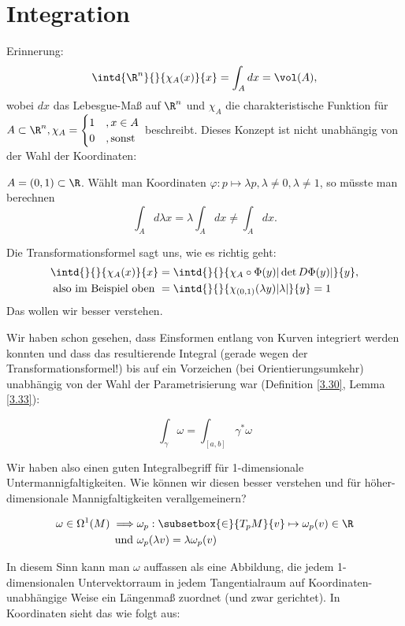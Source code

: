 \chapter{Integration}
\lecture

Erinnerung: 
	\[ \intd{\R^n}{}{\chi_A(x)}{x} = \int_A dx = \vol(A), \]
	wobei $dx$ das Lebesgue-Maß auf $\R^n$ und $\chi_A$ die charakteristische Funktion für $A \subset \R^n, \chi_A = \begin{cases}
		1 &, x \in A \\ 0  &, \text{sonst}
	\end{cases}$ beschreibt. Dieses Konzept ist nicht unabhängig von der Wahl der Koordinaten:

\begin{exmp*}
	\( A = (0,1) \subset \R \). Wählt man Koordinaten \( \varphi: p \mapsto \lambda p, \lambda \neq 0, \lambda \neq 1 \), so müsste man berechnen
	\[ \int_A d\lambda x = \lambda \int_A dx \neq \int_A dx. \]
\end{exmp*}

Die Transformationsformel sagt uns, wie es richtig geht:
\begin{align*}
	\intd{}{}{\chi_A(x)}{x} &= \intd{}{}{\chi_A \circ \Phi(y) |\det D\Phi(y)|}{y},\\
	\text{also im Beispiel oben } &= \intd{}{}{\chi_{(0,1)} (\lambda y) |\lambda|}{y} = 1
\end{align*}
Das wollen wir besser verstehen.

Wir haben schon gesehen, dass Einsformen entlang von Kurven integriert werden konnten und dass das resultierende Integral (gerade wegen der Transformationsformel!) bis auf ein Vorzeichen (bei Orientierungsumkehr) unabhängig von der Wahl der Parametrisierung war (Definition \ref{3.30}, Lemma \ref{3.33}):

\[ \int_\gamma \omega = \int_{[a,b]} \gamma^*\omega \]

Wir haben also einen guten Integralbegriff für 1-dimensionale Untermannigfaltigkeiten. Wie können wir diesen besser verstehen und für höher-dimensionale Mannigfaltigkeiten verallgemeinern?

\begin{align*}
	\omega \in \Omega^1(M) \implies &\omega_p: \subsetbox{\in}{T_pM}{v} \mapsto \omega_p(v) \in \R\\
	\text{und } &\omega_p (\lambda v) = \lambda \omega_p(v)
\end{align*}

In diesem Sinn kann man $\omega$ auffassen als eine Abbildung, die jedem 1-dimensionalen Untervektorraum in jedem Tangentialraum auf Koordinaten-unabhängige Weise ein Längenmaß zuordnet (und zwar gerichtet). In Koordinaten sieht das wie folgt aus:

